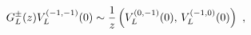 \begin{equation}
G_L^{\pm}(z)V_L^{(-1,-1)}(0)\sim {1\over z}\left(
V_L^{(0,-1)}(0),\,V_L^{(-1,0)}(0)\right) \ ,
\end{equation}

